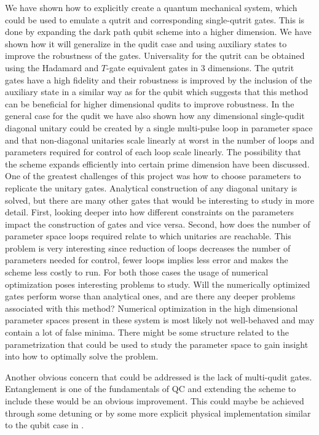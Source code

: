 We have shown how to explicitly create a quantum mechanical system, which could be used to emulate a qutrit and corresponding single-qutrit gates. This is done by expanding the dark path qubit scheme \cite{darkpath} into a higher dimension. We have shown how it will generalize in the qudit case and using auxiliary states to improve the robustness of the gates. Universality for the qutrit can be obtained using the Hadamard and $T$-gate equivalent gates in 3 dimensions. The qutrit gates have a high fidelity and their robustness is improved by the inclusion of the auxiliary state in a similar way as for the qubit \cite{darkpath} which suggests that this method can be beneficial for higher dimensional qudits to improve robustness. In the general case for the qudit we have also shown how any dimensional single-qudit diagonal unitary could be created by a single multi-pulse loop in parameter space and that non-diagonal unitaries scale linearly at worst in the number of loops and parameters required for control of each loop scale linearly. The possibility that the scheme expands efficiently into certain prime dimension have been discussed.
\\

\noindent One of the greatest challenges of this project was how to choose parameters to replicate the unitary gates. Analytical construction of any diagonal unitary is solved, but there are many other gates that would be interesting to study in more detail. First, looking deeper into how different constraints on the parameters impact the construction of gates and vice versa. Second, how does the number of parameter space loops required relate to which unitaries are reachable. This problem is very interesting since reduction of loops decreases the number of parameters needed for control, fewer loops implies less error and makes the scheme less costly to run. For both those cases the usage of numerical optimization poses interesting problems to study. Will the numerically optimized gates perform worse than analytical ones, and are there any deeper problems associated with this method? Numerical optimization in the high dimensional parameter spaces present in these system is most likely not well-behaved and may contain a lot of false minima. There might be some structure related to the parametrization that could be used to study the parameter space to gain insight into how to optimally solve the problem.
 
Another obvious concern that could be addressed is the lack of multi-qudit gates. Entanglement is one of the fundamentals of QC and extending the scheme to include these would be an obvious improvement. This could maybe be achieved through some detuning or by some more explicit physical implementation similar to the qubit case in \cite{darkpath}.

